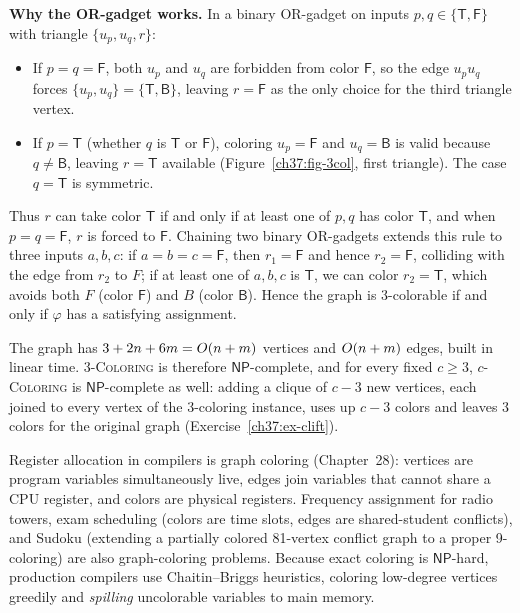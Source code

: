 \begin{whybox}
\textbf{Why the OR-gadget works.} In a binary OR-gadget on inputs $p,q\in\{\mathsf{T},\mathsf{F}\}$ with triangle $\{u_p,u_q,r\}$:
\begin{itemize}
  \item If $p=q=\mathsf{F}$, both $u_p$ and $u_q$ are forbidden from color $\mathsf{F}$, so the edge $u_pu_q$ forces $\{u_p,u_q\}=\{\mathsf{T},\mathsf{B}\}$, leaving $r=\mathsf{F}$ as the only choice for the third triangle vertex.
  \item If $p=\mathsf{T}$ (whether $q$ is $\mathsf{T}$ or $\mathsf{F}$), coloring $u_p=\mathsf{F}$ and $u_q=\mathsf{B}$ is valid because $q\neq\mathsf{B}$, leaving $r=\mathsf{T}$ available (Figure~\ref{ch37:fig-3col}, first triangle). The case $q=\mathsf{T}$ is symmetric.
\end{itemize}
Thus $r$ can take color $\mathsf{T}$ if and only if at least one of $p,q$ has color $\mathsf{T}$, and when $p=q=\mathsf{F}$, $r$ is forced to $\mathsf{F}$. Chaining two binary OR-gadgets extends this rule to three inputs $a,b,c$: if $a=b=c=\mathsf{F}$, then $r_1=\mathsf{F}$ and hence $r_2=\mathsf{F}$, colliding with the edge from $r_2$ to $F$; if at least one of $a,b,c$ is $\mathsf{T}$, we can color $r_2=\mathsf{T}$, which avoids both $F$ (color $\mathsf{F}$) and $B$ (color $\mathsf{B}$). Hence the graph is 3-colorable if and only if $\varphi$ has a satisfying assignment.
\end{whybox}

The graph has $3 + 2n + 6m = O(n+m)$ vertices and $O(n+m)$ edges, built in linear time.
\textsc{3-Coloring} is therefore $\mathsf{NP}$-complete, and for every fixed $c\ge 3$,
\textsc{$c$-Coloring} is $\mathsf{NP}$-complete as well: adding a clique of $c-3$ new vertices, each joined to every vertex of the 3-coloring instance, uses up $c-3$ colors and leaves $3$ colors for the original graph (Exercise~\ref{ch37:ex-clift}).

\begin{applicationbox}
Register allocation in compilers is graph coloring (Chapter~28): vertices are program
variables simultaneously live, edges join variables that cannot share a CPU register, and colors
are physical registers. Frequency assignment for radio towers, exam scheduling
(colors are time slots, edges are shared-student conflicts), and Sudoku (extending a partially colored
81-vertex conflict graph to a proper 9-coloring) are also graph-coloring problems. Because exact coloring is
$\mathsf{NP}$-hard, production compilers use Chaitin--Briggs heuristics, coloring low-degree vertices greedily and \emph{spilling} uncolorable variables to main memory.
\end{applicationbox}

